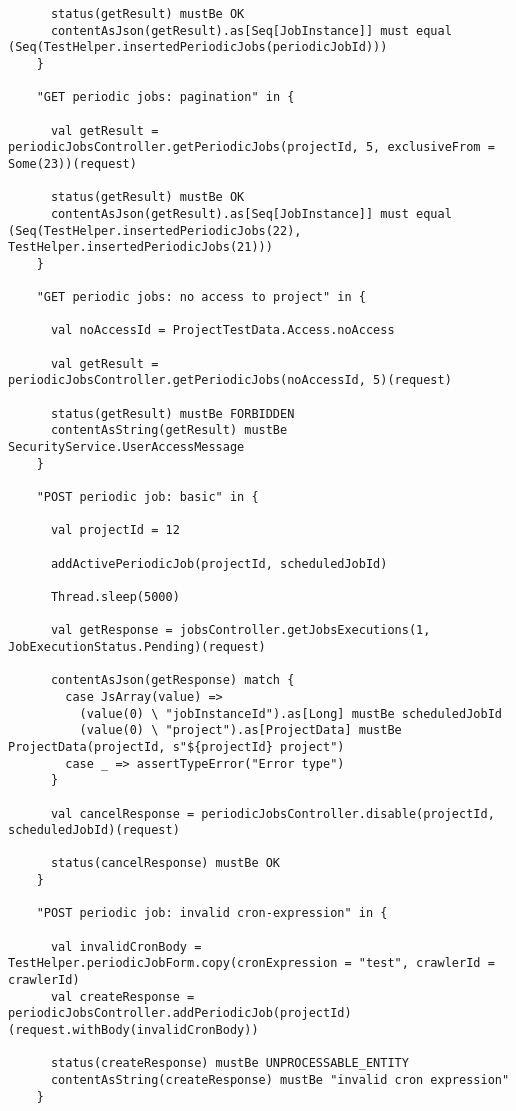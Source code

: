 \begin{lstlisting}
      status(getResult) mustBe OK
      contentAsJson(getResult).as[Seq[JobInstance]] must equal (Seq(TestHelper.insertedPeriodicJobs(periodicJobId)))
    }

    "GET periodic jobs: pagination" in {

      val getResult = periodicJobsController.getPeriodicJobs(projectId, 5, exclusiveFrom = Some(23))(request)

      status(getResult) mustBe OK
      contentAsJson(getResult).as[Seq[JobInstance]] must equal (Seq(TestHelper.insertedPeriodicJobs(22), TestHelper.insertedPeriodicJobs(21)))
    }

    "GET periodic jobs: no access to project" in {

      val noAccessId = ProjectTestData.Access.noAccess

      val getResult = periodicJobsController.getPeriodicJobs(noAccessId, 5)(request)

      status(getResult) mustBe FORBIDDEN
      contentAsString(getResult) mustBe SecurityService.UserAccessMessage
    }

    "POST periodic job: basic" in {

      val projectId = 12

      addActivePeriodicJob(projectId, scheduledJobId)

      Thread.sleep(5000)

      val getResponse = jobsController.getJobsExecutions(1, JobExecutionStatus.Pending)(request)

      contentAsJson(getResponse) match {
        case JsArray(value) =>
          (value(0) \ "jobInstanceId").as[Long] mustBe scheduledJobId
          (value(0) \ "project").as[ProjectData] mustBe ProjectData(projectId, s"${projectId} project")
        case _ => assertTypeError("Error type")
      }

      val cancelResponse = periodicJobsController.disable(projectId, scheduledJobId)(request)

      status(cancelResponse) mustBe OK
    }

    "POST periodic job: invalid cron-expression" in {

      val invalidCronBody = TestHelper.periodicJobForm.copy(cronExpression = "test", crawlerId = crawlerId)
      val createResponse = periodicJobsController.addPeriodicJob(projectId)(request.withBody(invalidCronBody))

      status(createResponse) mustBe UNPROCESSABLE_ENTITY
      contentAsString(createResponse) mustBe "invalid cron expression"
    }


\end{lstlisting}
